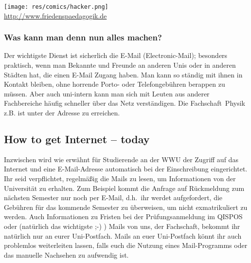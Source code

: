 \begin{multicols}{2}
\texttt{[image: res/comics/hacker.png]}\\
{\scriptsize\url{http://www.friedenspaedagogik.de}}

\subsubsection*{Was kann man denn nun alles machen?}
Der wichtigste Dienst ist sicherlich die E-Mail (Electronic-Mail); besonders praktisch, wenn man Bekannte und Freunde an anderen Unis oder in anderen Städten hat, die einen E-Mail Zugang haben. Man kann so ständig mit ihnen in Kontakt bleiben, ohne horrende Porto- oder Telefongebühren berappen zu müssen. Aber auch uni-intern kann man sich mit Leuten aus anderer Fachbereiche häufig schneller über das Netz verständigen. Die Fachschaft~Physik z.B. ist unter der Adresse  zu erreichen.

%
%
%

\subsection*{How to get Internet -- today}
Inzwischen wird wie erwähnt für Studierende an der WWU der Zugriff auf das Internet und eine E-Mail-Adresse automatisch bei der Einschreibung eingerichtet. Ihr seid verpflichtet, regelmäßig die Mails zu lesen, um Informationen von der Universität zu erhalten. Zum Beispiel kommt die Anfrage auf Rückmeldung zum nächsten Semester nur noch per E-Mail, d.h.\ ihr werdet aufgefordert, die Gebühren für das kommende Semester zu überweisen, um nicht exmatrikuliert zu werden. Auch Informationen zu Fristen bei der Prüfungsanmeldung im QISPOS oder (natürlich das wichtigste ;-) ) Mails von uns, der Fachschaft, bekommt ihr natürlich nur an eurer Uni-Postfach. Mails an euer Uni-Postfach könnt ihr auch problemlos weiterleiten lassen, falls euch die Nutzung eines Mail-Programms oder das manuelle Nachsehen zu aufwendig ist.


\end{multicols}
